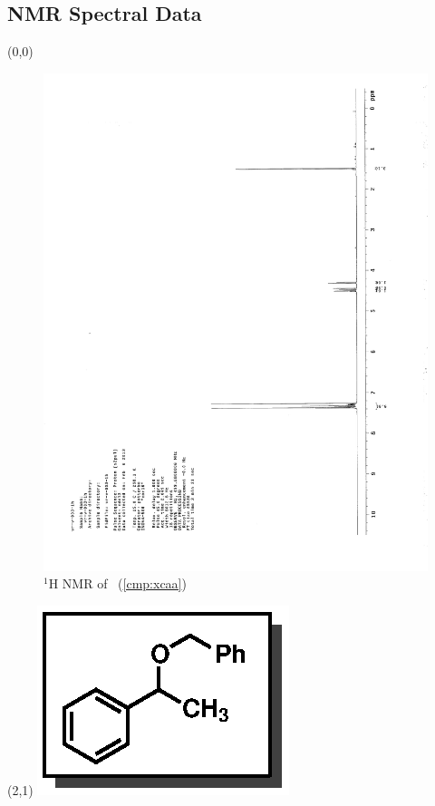 \subsection{NMR Spectral Data}


\begin{textblock}{20}(0,0)
\begin{figure}[htb]
\caption{$^1$H NMR of \CMPxcaa\ (\ref{cmp:xcaa})}
\includegraphics[scale=0.75, trim = 0mm 0mm 0mm 5mm,
clip]{chp_alkylation/images/nmr/xcaaH}
\vspace{-100pt}
\end{figure}
\end{textblock}
\begin{textblock}{1}(2,1)
\includegraphics[scale=0.8, angle=90]{chp_alkylation/images/xcaa}
\end{textblock}
